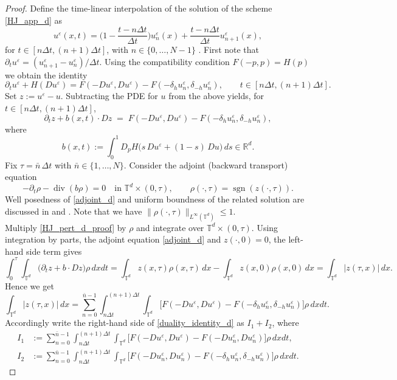 \documentclass[11pt]{amsart}
\theoremstyle{remark}
\theoremstyle{definition}
\theoremstyle{Claim}
\newcommand{\T}{{\mathbb{T}}}
\newcommand{\R}{\mathbb{R}}
\theoremstyle{plain}
\begin{document}
\begin{proof}
Define the time-linear interpolation of the solution of the scheme \eqref{HJ_app_d} as
\begin{equation}\label{time_interpolation}
	u^\varepsilon(x,t)=\Big(1-\frac{t-n\Delta t}{\Delta t}\Big)u^\varepsilon_n(x)+\frac{t-n\Delta t}{\Delta t}u^\varepsilon_{n+1}(x),
\end{equation}
for \(t\in[n\Delta t,(n+1)\Delta t]\), with \(n\in\{0,\dots,N-1\}\) .
 First note that \(\partial_t u^\varepsilon=(u^\varepsilon_{n+1}-u^\varepsilon_n)/\Delta t\). Using the compatibility condition \(F(-p,p)=H(p)\) we obtain the identity
\[
\partial_t u^\varepsilon + H(D u^\varepsilon)
= F(-D u^\varepsilon, D u^\varepsilon) - F(-\delta_h u^\varepsilon_n,\delta_{-h} u^\varepsilon_n),
\qquad t\in[n\Delta t,(n+1)\Delta t].
\]
Set \(z:=u^\varepsilon-u\). Subtracting the PDE for \(u\) from the above yields, for \(t\in[n\Delta t,(n+1)\Delta t]\),
\begin{equation}\label{HJ_pert_d_proof}
  \partial_t z + b(x,t)\cdot D z
  \;=\;
  F(-D u^\varepsilon, D u^\varepsilon) - F(-\delta_h u^\varepsilon_n,\delta_{-h} u^\varepsilon_n),
\end{equation}
where
\[
b(x,t):=\int_0^1 D_pH\big(s\,D u^\varepsilon+(1-s)\,D u\big)\,ds \in\R^d.
\]
Fix \(\tau=\bar n\,\Delta t\) with \(\bar n\in\{1,\dots,N\}\). Consider the adjoint (backward transport) equation
\begin{equation}\label{adjoint_d}
  -\partial_t \rho - \operatorname{div}(b \rho)=0\quad\text{in }\T^d\times(0,\tau),\qquad
  \rho(\cdot,\tau)=\operatorname{sgn}(z(\cdot,\tau)).
\end{equation}
Well posedness of \eqref{adjoint_d} and uniform boundness of the related solution are discussed in \cite[pag. 710]{lt} and \cite[Thm. 4.12]{f}. Note that we have \(\|\rho(\cdot,\tau)\|_{L^\infty(\T^d)}\le 1\).\\
Multiply \eqref{HJ_pert_d_proof} by \(\rho\) and integrate over \(\T^d\times(0,\tau)\).  Using integration by parts, the adjoint equation \eqref{adjoint_d} and  $z(\cdot,0)=0$, the left-hand side term gives
\[
\int_0^\tau\!\!\int_{\T^d} \big(\partial_t z+ b\cdot Dz\big)\rho\,dxdt
= \int_{\T^d} z(x,\tau)\rho(x,\tau)\,dx - \int_{\T^d} z(x,0)\rho(x,0)\,dx= \int_{\T^d} |z(\tau,x)|\,dx .
\]
Hence we get
\begin{equation}\label{duality_identity_d}
\int_{\T^d} |z(\tau,x)|\,dx
=\sum_{n=0}^{\bar n-1}\int_{n\Delta t}^{(n+1)\Delta t}\!\!\int_{\T^d}\big[F(-D u^\varepsilon, D u^\varepsilon)-F(-\delta_h u^\varepsilon_n,\delta_{-h} u^\varepsilon_n)\big]\rho\,dxdt.
\end{equation}
Accordingly write the right-hand side of \eqref{duality_identity_d} as \(I_1+I_2\), where
\[
\begin{aligned}
I_1 &:=\sum_{n=0}^{\bar n-1}\int_{n\Delta t}^{(n+1)\Delta t}\!\!\int_{\T^d}\big[F(-D u^\varepsilon, D u^\varepsilon)-F(-D u^\varepsilon_n, D u^\varepsilon_n)\big]\rho\,dxdt,\\
I_2 &:=\sum_{n=0}^{\bar n-1}\int_{n\Delta t}^{(n+1)\Delta t}\!\!\int_{\T^d}\big[F(-D u^\varepsilon_n, D u^\varepsilon_n)-F(-\delta_h u^\varepsilon_n,\delta_{-h} u^\varepsilon_n)\big]\rho\,dxdt.
\end{aligned}
\]


\end{proof}
\end{document}
